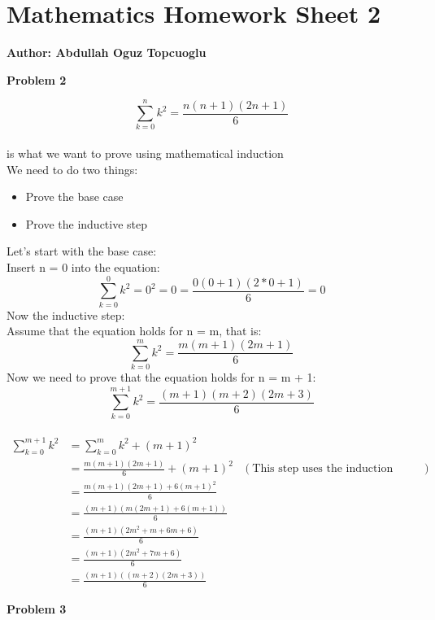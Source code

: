 \documentclass{article}
\begin{document}
\section*{\huge Mathematics Homework Sheet 2}
\begin{flushright}
   \textbf{Author: Abdullah Oguz Topcuoglu}
\end{flushright}

\begin{flushleft}
   \textbf{\Large Problem 2}
\end{flushleft}

\[
   \sum_{k=0}^{n} k^2 = \frac{n(n+1)(2n+1)}{6}
\]
\\
is what we want to prove using mathematical induction \\
We need to do two things: \\
\begin{itemize}
   \item Prove the base case
   \item Prove the inductive step
\end{itemize}
Let's start with the base case: \\
Insert n = 0 into the equation:
\[
   \sum_{k=0}^{0} k^2 = 0^2 = 0 = \frac{0(0+1)(2*0+1)}{6} = 0
\]
Now the inductive step: \\
Assume that the equation holds for n = m, that is:
\[
   \sum_{k=0}^{m} k^2 = \frac{m(m+1)(2m+1)}{6}
\]
Now we need to prove that the equation holds for n = m + 1:
\[
   \sum_{k=0}^{m+1} k^2 = \frac{(m+1)(m+2)(2m+3)}{6}
\]
\\
\begin{align*}
   \sum_{k=0}^{m+1} k^2 & = \sum_{k=0}^{m} k^2 + (m+1)^2     \\
                        & = \frac{m(m+1)(2m+1)}{6} + (m+1)^2 & (\text{This step uses the induction assumption}) \\
                        &= \frac{m(m+1)(2m+1) + 6 (m+1)^2}{6} \\
                        &= \frac{(m+1)(m(2m+1)+6(m+1))}{6} \\
                        &= \frac{(m+1)(2m^2+m+6m+6)}{6} \\
                        &= \frac{(m+1)(2m^2+7m+6)}{6} \\
                        &= \frac{(m+1)((m+2)(2m+3))}{6}
\end{align*}

\begin{flushleft}
   \textbf{\Large Problem 3}
\end{flushleft}
\end{document}
